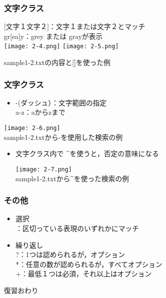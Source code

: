 \documentclass[dvipdfmx,11pt,notheorems]{beamer}
\begin{document}
\begin{frame}
\frametitle{文字クラス}
 [文字１文字２]：文字１または文字２とマッチ\\
gr[ea]y：grey または grayが表示\\
\texttt{[image: 2-4.png]}
\texttt{[image: 2-5.png]}
\begin{center}
sample1-2.txtの内容と[]を使った例
\end{center}
\end{frame}

\begin{frame}
\frametitle{文字クラス}
\begin{itemize}
\item-(ダッシュ）：文字範囲の指定\\
a-z：aからzまで\\
\end{itemize}
\begin{center}
\texttt{[image: 2-6.png]}\\
sample1-2.txtから-を使用した検索の例\\
\end{center}
\vspace{\baselineskip}
\begin{itemize}
\item 文字クラス内で \^{}を使うと，否定の意味になる
\begin{center}
\texttt{[image: 2-7.png]}\\
sample1-2.txtから\^{}を使った検索の例
\end{center}
\end{itemize}
\end{frame}

\begin{frame}
\frametitle{その他}
\begin{itemize}
\item 選択\\
\textbar：区切っている表現のいずれかにマッチ
\item 繰り返し\\
?：1つは認められるが，オプション\\
*：任意の数が認められるが，すべてオプション\\
+：最低１つは必須，それ以上はオプション
\end{itemize}
\end{frame}

\begin{frame}
\begin{center}
復習おわり
\end{center}
\end{frame}
\end{document}
